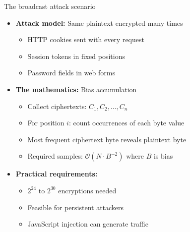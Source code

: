 \documentclass[aspectratio=169, lualatex, handout]{beamer}
\begin{document}
\begin{frame}{The broadcast attack scenario}
	\begin{itemize}
		\item \textbf{Attack model:} Same plaintext encrypted many times
		      \begin{itemize}
			      \item HTTP cookies sent with every request
			      \item Session tokens in fixed positions
			      \item Password fields in web forms
		      \end{itemize}
		\item \textbf{The mathematics:} Bias accumulation
		      \begin{itemize}
			      \item Collect ciphertexts: $C_1, C_2, \ldots, C_n$
			      \item For position $i$: count occurrences of each byte value
			      \item Most frequent ciphertext byte reveals plaintext byte
			      \item Required samples: $\mathcal{O}(N \cdot B^{-2})$ where $B$ is bias
		      \end{itemize}
		\item \textbf{Practical requirements:}
		      \begin{itemize}
			      \item $2^{24}$ to $2^{30}$ encryptions needed
			      \item Feasible for persistent attackers
			      \item JavaScript injection can generate traffic
		      \end{itemize}
	\end{itemize}
\end{frame}
\end{document}
